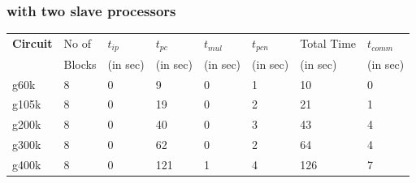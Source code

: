 \documentclass[12pt,psfig,a4]{article}
\begin{document}
\subsubsection{with two slave processors}
\tiny
\begin{table}[ht]
\begin{center}
\begin{tabular}{|l|l|l|l|l|l|l|l|} 
\hline
{\bf Circuit} & No of & $t_{ip}$ & $t_{pc}$ & $t_{mul}$ &  $t_{pcn}$ & Total Time & $t_{comm}$ \\ 
              & Blocks& (in sec)& (in sec)  & (in sec)  &  (in sec)  & (in sec)   & (in sec)   \\ \hline 
g60k&  \hspace{0.2in}8 & \hspace{0.2in}0 & \hspace{0.2in} 9& \hspace{0.2in}0& \hspace{0.2in}1& \hspace{0.2in}10& \hspace{0.2in}0     \\ \hline 
g105k& \hspace{0.2in}8 & \hspace{0.2in}0 & \hspace{0.2in}19& \hspace{0.2in}0& \hspace{0.2in}2& \hspace{0.2in}21& \hspace{0.2in}1     \\ \hline 
g200k& \hspace{0.2in}8 & \hspace{0.2in}0 & \hspace{0.2in}40& \hspace{0.2in}0& \hspace{0.2in}3& \hspace{0.2in}43& \hspace{0.2in}4     \\ \hline 
g300k& \hspace{0.2in}8 & \hspace{0.2in}0 & \hspace{0.2in}62& \hspace{0.2in}0& \hspace{0.2in}2& \hspace{0.2in}64& \hspace{0.2in}4   \\ \hline 
g400k& \hspace{0.2in}8 & \hspace{0.2in}0 & \hspace{0.2in}121& \hspace{0.2in}1& \hspace{0.2in}4& \hspace{0.2in}126& \hspace{0.2in}7   \\ \hline 

\end{tabular}
\end{center}
\end{table}
\end{document}
